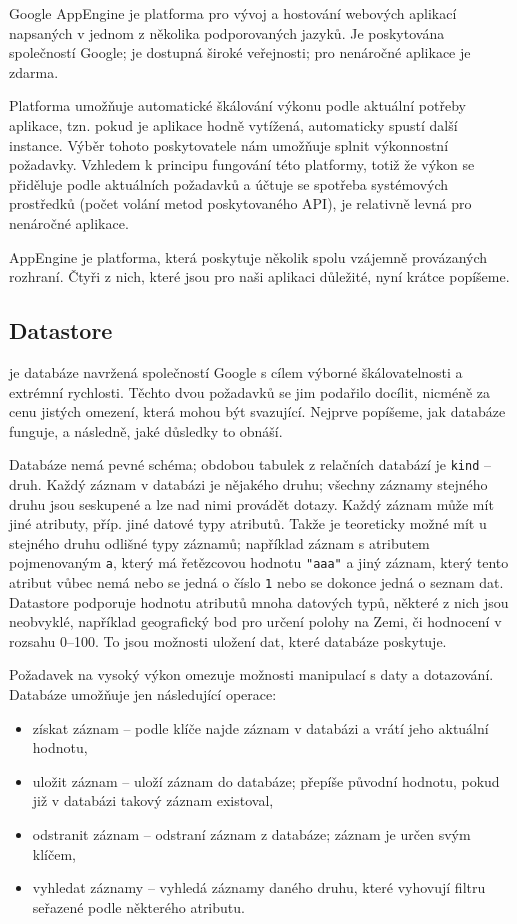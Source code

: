 Google AppEngine je platforma pro vývoj a hostování webových aplikací napsaných v jednom z několika podporovaných jazyků.
Je poskytována společností Google; je dostupná široké veřejnosti; pro nenáročné aplikace je zdarma.

Platforma umožňuje automatické škálování výkonu podle aktuální potřeby aplikace, tzn. pokud je aplikace hodně vytížená, automaticky spustí další instance.
Výběr tohoto poskytovatele nám umožňuje splnit výkonnostní požadavky.
Vzhledem k principu fungování této platformy, totiž že výkon se přiděluje podle aktuálních požadavků a účtuje se spotřeba systémových prostředků (počet volání metod poskytovaného API), je relativně levná pro nenáročné aplikace.

AppEngine je platforma, která poskytuje několik spolu vzájemně provázaných rozhraní.
Čtyři z nich, které jsou pro naši aplikaci důležité, nyní krátce popíšeme.

\subsection{Datastore}
 je databáze navržená společností Google s cílem výborné škálovatelnosti a extrémní rychlosti.
Těchto dvou požadavků se jim podařilo docílit, nicméně za cenu jistých omezení, která mohou být svazující.
Nejprve popíšeme, jak databáze funguje, a následně, jaké důsledky to obnáší.

Databáze nemá pevné schéma; obdobou tabulek z relačních databází je \verb|kind| -- druh.
Každý záznam v databázi je nějakého druhu; všechny záznamy stejného druhu jsou seskupené a lze nad nimi provádět dotazy.
Každý záznam může mít jiné atributy, příp. jiné datové typy atributů.
Takže je teoreticky možné mít u stejného druhu odlišné typy záznamů; například záznam s atributem pojmenovaným \verb|a|, který má řetězcovou hodnotu \verb|"aaa"| a jiný záznam, který tento atribut vůbec nemá nebo se jedná o číslo \verb|1| nebo se dokonce jedná o seznam dat.
Datastore podporuje hodnotu atributů mnoha datových typů, některé z nich jsou neobvyklé, například geografický bod pro určení polohy na Zemi, či hodnocení v rozsahu \mbox{0--100}.
To jsou možnosti uložení dat, které databáze poskytuje.

Požadavek na vysoký výkon omezuje možnosti manipulací s daty a dotazování.
Databáze umožňuje jen následující operace:
\begin{itemize}
	\item získat záznam -- podle klíče najde záznam v databázi a vrátí jeho aktuální hodnotu,
	\item uložit záznam -- uloží záznam do databáze; přepíše původní hodnotu, pokud již v databázi takový záznam existoval,
	\item odstranit záznam -- odstraní záznam z databáze; záznam je určen svým klíčem,
	\item vyhledat záznamy -- vyhledá záznamy daného druhu, které vyhovují filtru seřazené podle některého atributu.
\end{itemize}

